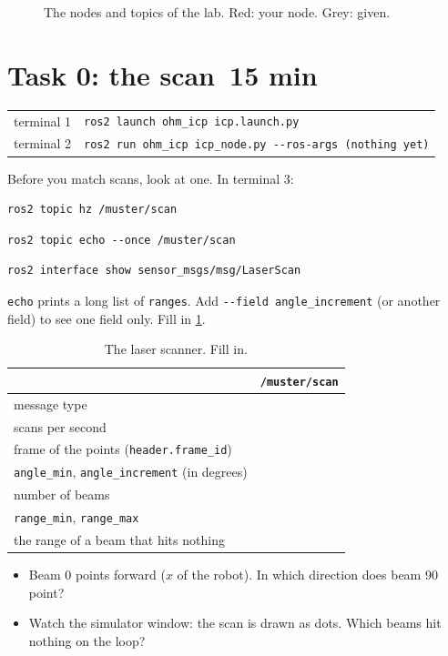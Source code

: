 \documentclass[11pt,a4paper,parskip=half]{scrartcl}
\makeatletter
\newcommand{\thema}[1]{\texttt{#1}}
\newcommand{\minutes}[1]{\hfill{\normalsize\mdseries\color{ohmgrey}\faClock[regular]~#1 min}}
\newcommand{\running}[2]{\begin{tcolorbox}[base, colback=black!3, borderline west={2.5pt}{0pt}{ohmgrey},
        title={\faTerminal~Running}, coltitle=ohmgrey, colbacktitle=black!3, fonttitle=\small\bfseries,
        toptitle=2pt, bottomtitle=0pt, fontupper=\small]
  \begin{tabularx}{\linewidth}{@{}>{\color{ohmgrey}}l >{\raggedright\arraybackslash}X@{}}
    terminal 1 & \texttt{ros2 launch ohm\_icp icp.launch.py#1} \\
    terminal 2 & \texttt{ros2 run ohm\_icp icp\_node.py -\kern0pt-ros-args #2}
  \end{tabularx}
\end{tcolorbox}}
\makeatother
\begin{document}
\begin{figure}[!hb]
  \centering
  \resizebox{\linewidth}{!}{}
  \caption{The nodes and topics of the lab. Red: your node. Grey: given.}
  \label{fig:nodes}
\end{figure}

\clearpage
\section{Task 0: the scan\minutes{15}}
\label{sec:task0}
\running{}{(nothing yet)}

Before you match scans, look at one. In terminal 3:
\begin{lstlisting}
ros2 topic hz /muster/scan
\end{lstlisting}
\begin{lstlisting}
ros2 topic echo --once /muster/scan
\end{lstlisting}
\begin{lstlisting}
ros2 interface show sensor_msgs/msg/LaserScan
\end{lstlisting}
\thema{echo} prints a long list of \thema{ranges}. Add \thema{-{}-field angle\_increment} (or another field)
to see one field only. Fill in \cref{tab:scan}.

\begin{table}[ht]\centering
\renewcommand{\arraystretch}{1.5}
\caption{The laser scanner. Fill in.}
\label{tab:scan}
\begin{tabular}{@{}>{\raggedright\arraybackslash}p{7.4cm}p{6.0cm}@{}}
\toprule
& \thema{/muster/scan} \\
\midrule
message type & \\
scans per second & \\
frame of the points (\thema{header.frame\_id}) & \\
\thema{angle\_min}, \thema{angle\_increment} (in degrees) & \\
number of beams & \\
\thema{range\_min}, \thema{range\_max} & \\
the range of a beam that hits nothing & \\
\bottomrule
\end{tabular}
\end{table}

\begin{itemize}
  \item Beam 0 points forward (\(x\) of the robot). In which direction does beam 90 point?
  \item Watch the simulator window: the scan is drawn as dots. Which beams hit nothing on the loop?
\end{itemize}
\end{document}
